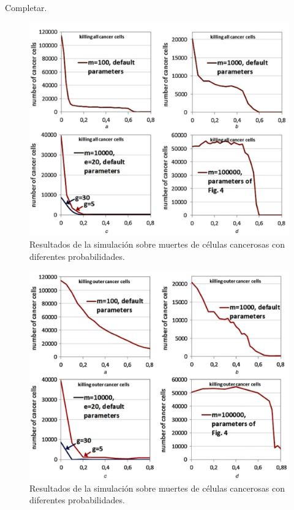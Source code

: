 Completar.

\begin{figure}[h]
\centering
\includegraphics[scale=0.7]{figures/experiments/exp7}
\caption{Resultados de la simulación sobre muertes de células cancerosas con diferentes probabilidades.}
\label{fig:exp7}
\end{figure}

\begin{figure}[h]
\centering
\includegraphics[scale=0.7]{figures/experiments/exp8}
\caption{Resultados de la simulación sobre muertes de células cancerosas con diferentes probabilidades.}
\label{fig:exp8}
\end{figure}
